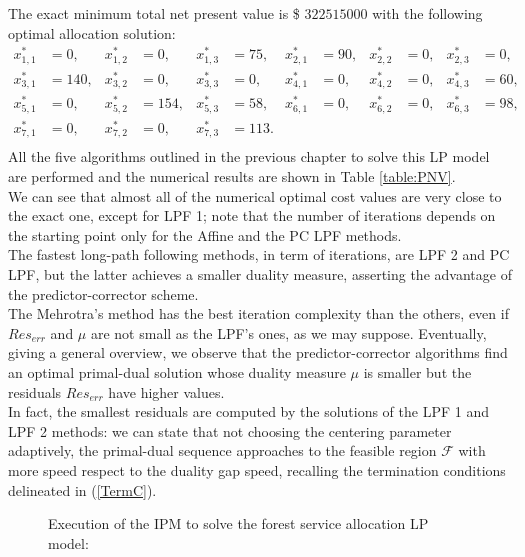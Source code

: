 \documentclass[a4paper,10 pt,titlepage,twoside]{book}
\theoremstyle{plain}
\theoremstyle{definition}
\theoremstyle{remark}
\begin{document}
{{The exact minimum total net present value is \$ $322515000$ with the following optimal allocation solution:
\begin{align*}
x_{1,1}^{*} &=  0, & x_{1,2}^{*}&= 0, & x_{1,3}^{*} &= 75, & x_{2,1}^{*} &= 90, & x_{2,2}^{*} &= 0, & x_{2,3}^{*} &= 0,\\
x_{3,1}^{*} &= 140, & x_{3,2}^{*}&= 0, & x_{3,3}^{*} &= 0, & x_{4,1}^{*} &= 0, & x_{4,2}^{*} &= 0, & x_{4,3}^{*} &= 60,\\
x_{5,1}^{*} &= 0, & x_{5,2}^{*}&= 154, & x_{5,3}^{*} &= 58, & x_{6,1}^{*} &= 0, & x_{6,2}^{*} &= 0, & x_{6,3}^{*} &= 98,\\
 x_{7,1}^{*}&= 0,&x_{7,2}^{*} &= 0, & x_{7,3}^{*} &= 113. & & & &  & & \\
\end{align*}
All the five algorithms outlined in the previous chapter to solve this LP model are performed and the numerical results are shown in Table \ref{table:PNV}.\\ 
We can see that almost all of the numerical optimal cost values are very close to the exact one, except for LPF 1; note that the number of iterations depends on the starting point only for the Affine and the PC LPF methods.\\
The fastest long-path following methods, in term of iterations, are LPF 2 and PC LPF, but the latter achieves a smaller duality measure, asserting the advantage of the predictor-corrector scheme.\\
The Mehrotra's method has the best iteration complexity than the others, even if $Res_{err}$ and $\mu$ are not small as the LPF's ones, as we may suppose. 
Eventually, giving a general overview, we observe that the predictor-corrector algorithms find an optimal primal-dual solution whose duality measure $\mu$ is smaller but the residuals $Res_{err}$ have higher values.\\
In fact, the smallest residuals are computed by the solutions of the LPF 1 and LPF 2 methods: we can state that not choosing the centering parameter adaptively, the primal-dual sequence approaches to the feasible region $\mathcal{F}$ with more speed respect to the duality gap speed, recalling the termination conditions delineated in (\ref{TermC}).\\
\begin{figure}\caption{\label{figure:for}Execution of the IPM to solve the forest service allocation LP model: }

\end{figure}}}
\end{document}
